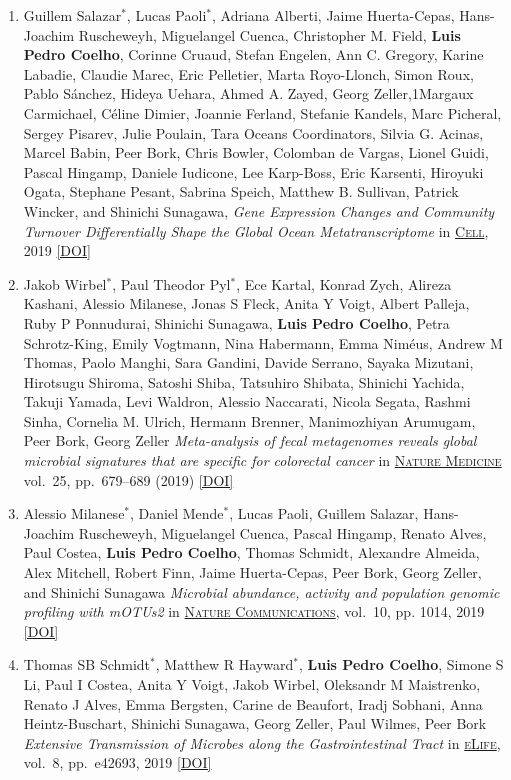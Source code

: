 \documentclass{article}
\newcommand\showdoi[1]{%
    \href{http://dx.doi.org/#1}{[DOI]}%
}
\newcommand\pubname[1]{\textsc{\uline{#1}}}
\newcommand\costar{${}^{*}$}
\begin{document}
\begin{enumerate}[resume]
\item Guillem Salazar\costar, Lucas Paoli\costar, Adriana Alberti, Jaime
Huerta-Cepas, Hans-Joachim Ruscheweyh, Miguelangel Cuenca, Christopher M.
Field, \textbf{Luis Pedro Coelho}, Corinne Cruaud, Stefan Engelen, Ann C.
Gregory, Karine Labadie, Claudie Marec, Eric Pelletier, Marta Royo-Llonch,
Simon Roux, Pablo Sánchez, Hideya Uehara, Ahmed A. Zayed, Georg Zeller,1Margaux
Carmichael, Céline Dimier, Joannie Ferland, Stefanie Kandels, Marc Picheral,
Sergey Pisarev, Julie Poulain, Tara Oceans Coordinators, Silvia G. Acinas,
Marcel Babin, Peer Bork, Chris Bowler, Colomban de Vargas, Lionel Guidi, Pascal
Hingamp, Daniele Iudicone, Lee Karp-Boss, Eric Karsenti, Hiroyuki Ogata,
Stephane Pesant, Sabrina Speich, Matthew B. Sullivan, Patrick Wincker, and
Shinichi Sunagawa, \emph{Gene Expression Changes and Community Turnover
Differentially Shape the Global Ocean Metatranscriptome} in \pubname{Cell},
2019 \showdoi{10.1016/j.cell.2019.10.014}

\item Jakob Wirbel\costar, Paul Theodor Pyl\costar, Ece Kartal, Konrad Zych,
Alireza Kashani, Alessio Milanese, Jonas S Fleck, Anita Y Voigt, Albert
Palleja, Ruby P Ponnudurai, Shinichi Sunagawa, \textbf{Luis Pedro Coelho},
Petra Schrotz-King, Emily Vogtmann, Nina Habermann, Emma Niméus, Andrew M
Thomas, Paolo Manghi, Sara Gandini, Davide Serrano, Sayaka Mizutani, Hirotsugu
Shiroma, Satoshi Shiba, Tatsuhiro Shibata, Shinichi Yachida, Takuji Yamada,
Levi Waldron, Alessio Naccarati, Nicola Segata, Rashmi Sinha, Cornelia M.
Ulrich, Hermann Brenner, Manimozhiyan Arumugam, Peer Bork, Georg Zeller
\emph{Meta-analysis of fecal metagenomes reveals global microbial signatures
that are specific for colorectal cancer} in \pubname{Nature Medicine} vol.\ 25,
pp.\ 679–689 (2019) \showdoi{10.1038/s41591-019-0406-6}

\item Alessio Milanese\costar, Daniel Mende\costar, Lucas Paoli, Guillem
Salazar, Hans-Joachim Ruscheweyh, Miguelangel Cuenca, Pascal Hingamp, Renato
Alves, Paul Costea, \textbf{Luis Pedro Coelho}, Thomas Schmidt, Alexandre
Almeida, Alex Mitchell, Robert Finn, Jaime Huerta-Cepas, Peer Bork, Georg
Zeller, and Shinichi Sunagawa \emph{Microbial abundance, activity and
population genomic profiling with mOTUs2} in \pubname{Nature Communications},
vol.\ 10, pp. 1014, 2019 \showdoi{10.1038/s41467-019-08844-4}

\item Thomas SB Schmidt\costar, Matthew R Hayward\costar, \textbf{Luis Pedro
Coelho}, Simone S Li, Paul I Costea, Anita Y Voigt, Jakob Wirbel, Oleksandr M
Maistrenko, Renato J Alves, Emma Bergsten, Carine de Beaufort, Iradj Sobhani,
Anna Heintz-Buschart, Shinichi Sunagawa, Georg Zeller, Paul Wilmes, Peer Bork
\emph{Extensive Transmission of Microbes along the Gastrointestinal Tract} in
\pubname{eLife}, vol.\ 8, pp.\ e42693, 2019 \showdoi{10.7554/eLife.42693}


\end{enumerate}
\end{document}
